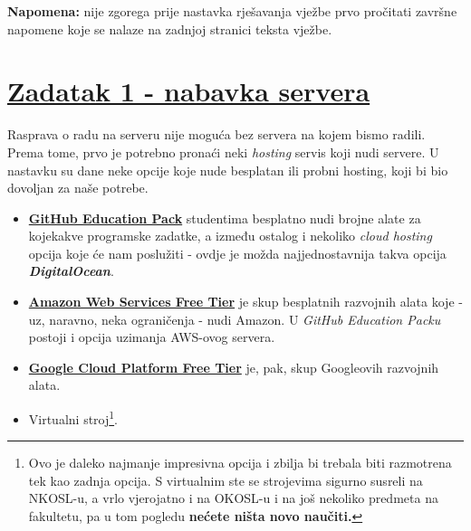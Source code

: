 \documentclass[12pt,a4paper]{article}
\begin{document}
	\textbf{Napomena:} nije zgorega prije nastavka rješavanja vježbe prvo pročitati završne napomene koje se nalaze na zadnjoj stranici teksta vježbe.

	\newpage

	\section*{\underline{Zadatak 1 - nabavka servera}}
	
	Rasprava o radu na serveru nije moguća bez servera na kojem bismo radili. Prema tome, prvo je potrebno pronaći neki \textit{hosting} servis koji nudi servere. U nastavku su dane neke opcije koje nude besplatan ili probni hosting, koji bi bio dovoljan za naše potrebe.
	
	\hfill
	\hfill
	\begin{itemize}
		\item \href{https://education.github.com/pack}{\textbf{GitHub Education Pack}} studentima besplatno nudi brojne alate za kojekakve programske zadatke, a između ostalog i nekoliko \textit{cloud hosting} opcija koje će nam poslužiti - ovdje je možda najjednostavnija takva opcija \textbf{\textit{DigitalOcean}}.

		\item \href{https://aws.amazon.com/free/}{\textbf{Amazon Web Services Free Tier}} je skup besplatnih razvojnih alata koje - uz, naravno, neka ograničenja - nudi Amazon. U \textit{GitHub Education Packu} postoji i opcija uzimanja AWS-ovog servera.

		\item \href{https://cloud.google.com/free/}{\textbf{Google Cloud Platform Free Tier}} je, pak, skup Googleovih razvojnih alata.

		\item Virtualni stroj\footnote{Ovo je daleko najmanje impresivna opcija i zbilja bi trebala biti razmotrena tek kao zadnja opcija. S virtualnim ste se strojevima sigurno susreli na NKOSL-u, a vrlo vjerojatno i na OKOSL-u i na još nekoliko predmeta na fakultetu, pa u tom pogledu \textbf{nećete ništa novo naučiti.}}. 
  	\end{itemize}
  	\vfill
\end{document}
